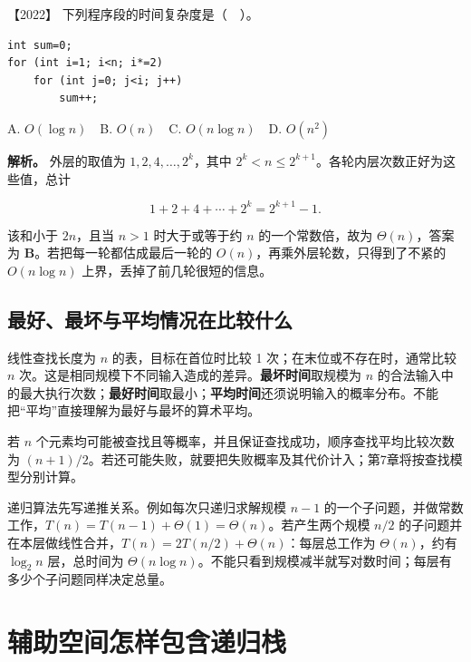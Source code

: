 \noindent{}【2022】 下列程序段的时间复杂度是（　）。

\par\medskip\noindent
\begin{minipage}{\linewidth}
\begin{verbatim}
int sum=0;
for (int i=1; i<n; i*=2)
    for (int j=0; j<i; j++)
        sum++;
\end{verbatim}
\end{minipage}\par\medskip

A. \(O(\log n)\)　B. \(O(n)\)　C. \(O(n\log n)\)　D. \(O(n^2)\)


\textbf{解析。} 外层的取值为 \(1,2,4,\ldots,2^k\)，其中 \(2^k<n\le2^{k+1}\)。各轮内层次数正好为这些值，总计

\[1+2+4+\cdots+2^k=2^{k+1}-1.\]

该和小于 \(2n\)，且当 \(n>1\) 时大于或等于约 \(n\) 的一个常数倍，故为 \(\Theta(n)\)，答案为 \textbf{B}。若把每一轮都估成最后一轮的 \(O(n)\)，再乘外层轮数，只得到了不紧的 \(O(n\log n)\) 上界，丢掉了前几轮很短的信息。

\subsection{最好、最坏与平均情况在比较什么}\label{ds-c01-h92}

线性查找长度为 \(n\) 的表，目标在首位时比较 1 次；在末位或不存在时，通常比较 \(n\) 次。这是相同规模下不同输入造成的差异。\textbf{最坏时间}取规模为 \(n\) 的合法输入中的最大执行次数；\textbf{最好时间}取最小；\textbf{平均时间}还须说明输入的概率分布。不能把``平均''直接理解为最好与最坏的算术平均。

若 \(n\) 个元素均可能被查找且等概率，并且保证查找成功，顺序查找平均比较次数为 \((n+1)/2\)。若还可能失败，就要把失败概率及其代价计入；第7章将按查找模型分别计算。

递归算法先写递推关系。例如每次只递归求解规模 \(n-1\) 的一个子问题，并做常数工作，\(T(n)=T(n-1)+\Theta(1)=\Theta(n)\)。若产生两个规模 \(n/2\) 的子问题并在本层做线性合并，\(T(n)=2T(n/2)+\Theta(n)\)：每层总工作为 \(\Theta(n)\)，约有 \(\log_2n\) 层，总时间为 \(\Theta(n\log n)\)。不能只看到规模减半就写对数时间；每层有多少个子问题同样决定总量。

\section{辅助空间怎样包含递归栈}\label{ds-01-04}

